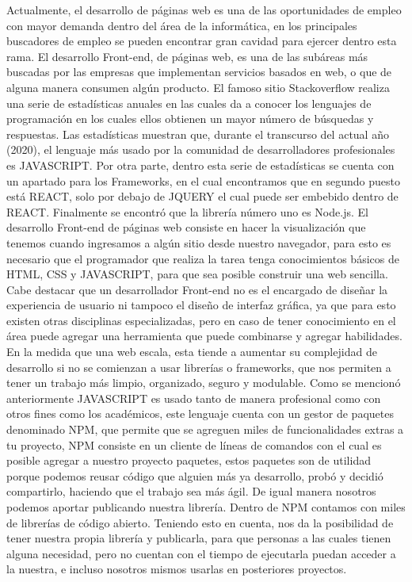 Actualmente, el desarrollo de páginas web es una de las oportunidades de empleo con mayor demanda dentro del área de la informática, en los principales buscadores de empleo se pueden encontrar gran cavidad para ejercer dentro esta rama. El desarrollo Front-end, de páginas web, es una de las subáreas más buscadas por las empresas que implementan servicios basados en web, o que de alguna manera consumen algún producto. 
El famoso sitio Stackoverflow realiza una serie de estadísticas anuales en las cuales da a conocer los lenguajes de programación en los cuales ellos obtienen un mayor número de búsquedas y respuestas. Las estadísticas muestran que, durante el transcurso del actual año (2020), el lenguaje más usado por la comunidad de desarrolladores profesionales es JAVASCRIPT. 
Por otra parte, dentro esta serie de estadísticas se cuenta con un apartado para los Frameworks, en el cual encontramos que en segundo puesto está REACT, solo por debajo de JQUERY el cual puede ser embebido dentro de REACT.  Finalmente se encontró que la librería número uno es Node.js. 
El desarrollo Front-end de páginas web consiste en hacer la visualización que tenemos cuando ingresamos a algún sitio desde nuestro navegador, para esto es necesario que el programador que realiza la tarea tenga conocimientos básicos de HTML, CSS y JAVASCRIPT, para que sea posible construir una web sencilla. Cabe destacar que un desarrollador Front-end no es el encargado de diseñar la experiencia de usuario ni tampoco el diseño de interfaz gráfica, ya que para esto existen otras disciplinas especializadas, pero en caso de tener conocimiento en el área puede agregar una herramienta que puede combinarse y agregar habilidades.  
En la medida que una web escala, esta tiende a aumentar su complejidad de desarrollo si no se comienzan a usar librerías o frameworks, que nos permiten a tener un trabajo más limpio, organizado, seguro y modulable. 
Como se mencionó anteriormente JAVASCRIPT es usado tanto de manera profesional como con otros fines como los académicos, este lenguaje cuenta con un gestor de paquetes denominado NPM, que permite que se agreguen miles de funcionalidades extras a tu proyecto, NPM consiste en un cliente de líneas de comandos con el cual es posible agregar a nuestro proyecto paquetes, estos paquetes son de utilidad porque podemos reusar código que alguien más ya desarrollo, probó y decidió compartirlo, haciendo que el trabajo sea más ágil.  De igual manera nosotros podemos aportar publicando nuestra librería. Dentro de NPM contamos con miles de librerías de código abierto.  
Teniendo esto en cuenta, nos da la posibilidad de tener nuestra propia librería y publicarla, para que personas a las cuales tienen alguna necesidad, pero no cuentan con el tiempo de ejecutarla puedan acceder a la nuestra, e incluso nosotros mismos usarlas en posteriores proyectos. 

